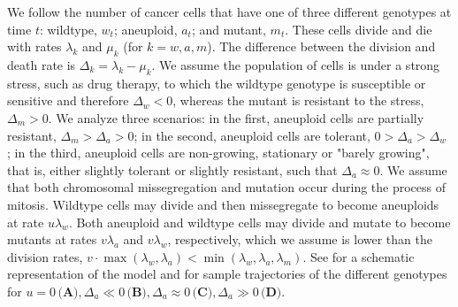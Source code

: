 \documentclass[12pt]{extarticle}
\begin{document}
We follow the number of cancer cells that have one of three different genotypes at time $t$: wildtype, $w_t$; aneuploid, $a_t$; and mutant, $m_t$. 
These cells divide and die with rates $\lambda_k$ and $\mu_k$ (for $k=w, a, m$).
The difference between the division and death rate is $\Delta_k = \lambda_k-\mu_k$.
We assume the population of cells is under a strong stress, such as drug therapy, to which the wildtype genotype is susceptible or sensitive and therefore $\Delta_w<0$, whereas the mutant is resistant to the stress, $\Delta_m>0$.
We analyze three scenarios: in the first, aneuploid cells are partially resistant, $\Delta_m>\Delta_a>0$; in the second, aneuploid cells are tolerant, $0>\Delta_a>\Delta_w$ \citep[see][for the distinction between susceptible, resistant, and tolerant]{brauner2016distinguishing}; in the third, aneuploid cells are non-growing, stationary or "barely growing", that is, either slightly tolerant or slightly resistant, such that $\Delta_a \approx 0$. We assume that both chromosomal missegregation and mutation occur during the process of mitosis. Wildtype cells may divide and then missegregate to become aneuploids at rate $u\lambda_w$. Both aneuploid and wildtype cells may divide and mutate to become mutants at rates $v\lambda_{a}$ and $v\lambda_{w}$, respectively, which we assume is lower than the division rates, $v\cdot\max{(\lambda_w, \lambda_a)}<\min{(\lambda_w, \lambda_a, \lambda_m)}$.
See  for a schematic representation of the model and  for sample trajectories of the different genotypes for $u=0 \,\textbf{(A)}, \Delta_a\ll0\, \textbf{(B)},\Delta_a\approx0\, \textbf{(C)},\Delta_a\gg0\, \textbf{(D)}$.


\end{document}
